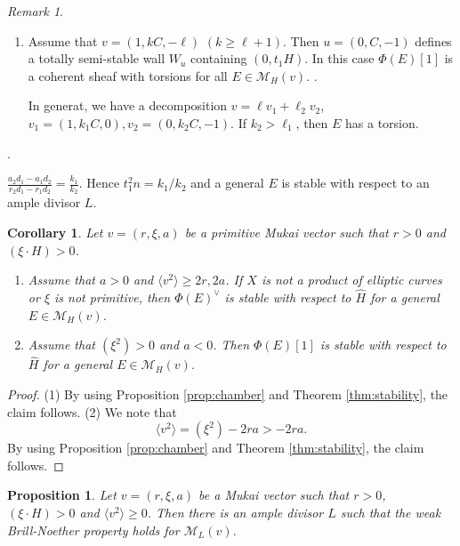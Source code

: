 \documentclass[10pt]{amsart}
\def\cal{\mathcal}
\newenvironment{NB}{
\color{red}{\bf NB}. \footnotesize 
}{}
\numberwithin{equation}{section}
\theoremstyle{plain}
\newtheorem{prop}[thm]{Proposition}
\newtheorem{cor}[thm]{Corollary}
\theoremstyle{definition}
\theoremstyle{remark}
\newtheorem{rem}[thm]{Remark}
\begin{document}
\begin{rem}
\begin{enumerate}
\begin{enumerate}
\item
Assume that
$v=(1,k C,-\ell)$ $(k \geq \ell+1)$.
Then $u=(0,C,-1)$ defines a totally semi-stable wall $W_u$
containing $(0,t_1 H)$. 
In this case $\Phi(E)[1]$ is a coherent sheaf with torsions for all $E \in {\cal M}_H(v)$.
\begin{NB}
In generat, we have a decomposition
$v=\ell v_1+\ell_2 v_2$, $v_1=(1,k_1 C,0), v_2=(0,k_2 C,-1)$.
If $k_2>\ell_1$, then $E$ has a torsion.
\end{NB}
\end{enumerate}
\begin{NB}
$\frac{a_2 d_1-a_1 d_2}{r_2 d_1-r_1 d_2}=\frac{k_1}{k_2}$.
Hence $t_1^2 n=k_1/k_2$ and a general $E$ is stable with respect to
an ample divisor $L$. 
\end{NB}
\end{enumerate}
\end{rem}

\begin{cor}\label{cor:stability}
Let $v=(r,\xi,a)$ be a primitive Mukai vector such that $r>0$ and $(\xi \cdot H)>0$.
\begin{enumerate}
\item[(1)]
Assume that $a>0$ and $\langle v^2 \rangle \geq 2r, 2a$.
If $X$ is not a product of elliptic curves or $\xi$ is not primitive, then
$\Phi(E)^{\vee}$ is stable with respect to $\widehat{H}$ for a general
$E \in {\cal M}_H(v)$.
\item[(2)]
Assume that $(\xi^2)>0$ and $a< 0$.
Then $\Phi(E)[1]$ is stable with respect to $\widehat{H}$ for a general
$E \in {\cal M}_H(v)$.
\end{enumerate}
\end{cor}

\begin{proof}
(1)
By using Proposition \ref{prop:chamber} and Theorem \ref{thm:stability},
the claim follows.
(2)
We note that 
$$
\langle v^2 \rangle=(\xi^2)-2ra > -2ra.
$$
By using Proposition \ref{prop:chamber} and Theorem \ref{thm:stability},
the claim follows.
\end{proof}


\begin{prop}\label{prop:wBN-L}
Let $v=(r,\xi,a)$ be a Mukai vector such that $r>0$, $(\xi \cdot H)>0$ and $\langle v^2 \rangle \geq 0$.
Then there is an ample divisor $L$ such that the weak Brill-Noether property holds for
${\cal M}_L(v)$.  
\end{prop}
\end{document}
